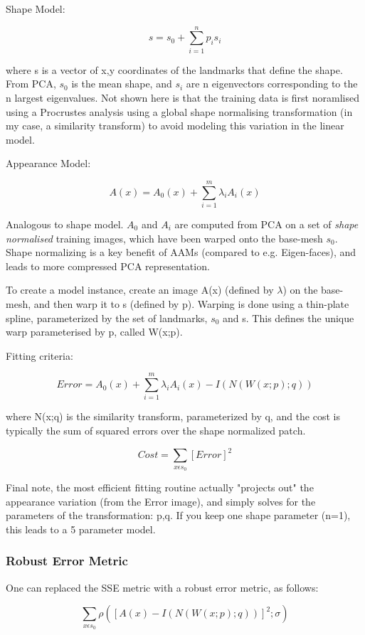 \documentclass[10pt,twocolumn,letterpaper]{article}
\begin{document}
Shape Model:

\[s = s_0 + \sum_{i=1}^n p_i s_i\]

where s is a vector of x,y coordinates of the landmarks that define the shape.  From PCA, $s_0$ is the mean shape, and $s_i$ are n eigenvectors corresponding to the n largest eigenvalues.  Not shown here is that the training data is first noramlised using a Procrustes analysis using a global shape normalising transformation (in my case, a similarity transform) to avoid modeling this variation in the linear model.

Appearance Model:

\[A(x) = A_0(x) + \sum_{i=1}^m \lambda_i A_i(x)\]

Analogous to shape model. $A_0$ and $A_i$ are computed from PCA on a set of \emph{shape normalised} training images, which have been warped onto the base-mesh $s_0$.  Shape normalizing is a key benefit of AAMs (compared to e.g. Eigen-faces), and leads to more compressed PCA representation.

To create a model instance, create an image A(x) (defined by $\lambda$) on the base-mesh, and then warp it to s (defined by p).  Warping is done using a thin-plate spline, parameterized by the set of landmarks, $s_0$ and s.  This defines the unique warp parameterised by p, called W(x;p).

Fitting criteria:

\[Error = A_0(x) + \sum_{i=1}^m \lambda_i A_i(x) - I(N(W(x;p);q)) \]

where N(x;q) is the similarity transform, parameterized by q, and the cost is typically the sum of squared errors over the shape normalized patch.

\[Cost = \sum_{x \epsilon s_0} [Error]^2 \]

Final note, the most efficient fitting routine actually "projects out" the appearance variation (from the Error image), and simply solves for the parameters of the transformation: p,q.  If you keep one shape parameter (n=1), this leads to a 5 parameter model.

\subsubsection{Robust Error Metric}

One can replaced the SSE metric with a robust error metric, as follows:

\[\sum_{x \epsilon s_0} \rho([A(x) - I(N(W(x;p);q))]^2; \sigma)\]
\end{document}

